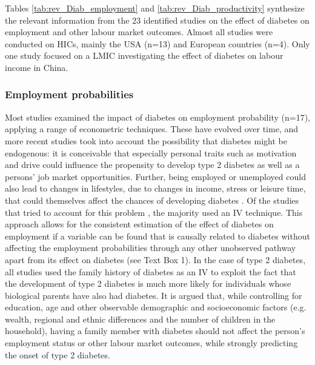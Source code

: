Tables \ref{tab:rev_Diab_employment} and \ref{tab:rev_Diab_productivity} synthesize the relevant information from the 23 identified studies on the effect of diabetes on employment and other labour market outcomes. Almost all studies were conducted on \acp{HIC}, mainly the USA (n=13) and European countries (n=4). Only one study focused on a \ac{LMIC} investigating the effect of diabetes on labour income in China.

\subsubsection{Employment probabilities}
Most studies examined the impact of diabetes on employment probability (n=17), applying a range of econometric techniques. These have evolved over time, and more recent studies took into account the possibility that diabetes might be endogenous: it is conceivable that especially personal traits such as motivation and drive could influence the propensity to develop type 2 diabetes as well as a persons' job market opportunities. Further, being employed or unemployed could also lead to changes in lifestyles, due to changes in income, stress or leisure time, that could themselves affect the chances of developing diabetes \parencite{Brown2005}. Of the studies that tried to account for this problem \parencite{Brown2005,Minor2011,Latif2009,Lin2011b,Zhang2009,Harris2009}, the majority used an \ac{IV} technique. This approach allows for the consistent estimation of the effect of diabetes on employment if a variable can be found that is causally related to diabetes without affecting the employment probabilities through any other unobserved pathway apart from its effect on diabetes (see Text Box 1). In the case of type 2 diabetes, all studies used the family history of diabetes as an \ac{IV} to exploit the fact that the development of type 2 diabetes is much more likely for individuals whose biological parents have also had diabetes. It is argued that, while controlling for education, age and other observable demographic and socioeconomic factors (e.g. wealth, regional and ethnic differences and the number of children in the household), having a family member with diabetes should not affect the person's employment status or other labour market outcomes, while strongly predicting the onset of type 2 diabetes. 

